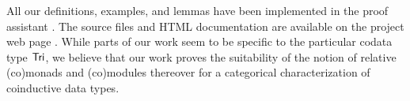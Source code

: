 \documentclass{easychair}
\begin{document}
 All our definitions, examples, and lemmas have been implemented in the proof assistant \coq. %
 The \coq source files and HTML documentation are available on the project web page \parencite{trimat_coq}.
 While parts of our work seem to be specific to the particular codata type $\mathsf{Tri}$,
 we believe that our work proves the suitability of the notion of relative (co)monads and (co)modules thereover for 
 a categorical characterization of coinductive data types.


 


\renewcommand*{\bibfont}{\small}
\printbibliography[heading=none]
\end{document}
